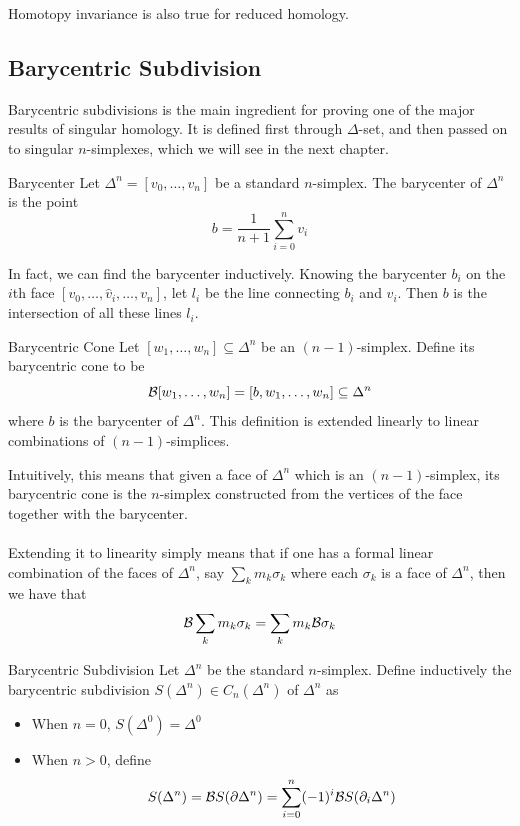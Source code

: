 \documentclass[a4paper]{article}
\begin{document}
Homotopy invariance is also true for reduced homology. 

\subsection{Barycentric Subdivision}
Barycentric subdivisions is the main ingredient for proving one of the major results of singular homology. It is defined first through $\Delta$-set, and then passed on to singular $n$-simplexes, which we will see in the next chapter. 

\begin{defn}{Barycenter}{} Let $\Delta^n=[v_0,\dots,v_n]$ be a standard $n$-simplex. The barycenter of $\Delta^n$ is the point $$b=\frac{1}{n+1}\sum_{i=0}^nv_i$$
\end{defn}

In fact, we can find the barycenter inductively. Knowing the barycenter $b_i$ on the $i$th face $[v_0,\dots,\hat{v}_i,\dots,v_n]$, let $l_i$ be the line connecting $b_i$ and $v_i$. Then $b$ is the intersection of all these lines $l_i$. 

\begin{defn}{Barycentric Cone}{} Let $[w_1,\dots,w_n]\subseteq\Delta^n$ be an $(n-1)$-simplex. Define its barycentric cone to be $$\mathcal{B}[w_1,\dots,w_n]=[b,w_1,\dots,w_n]\subseteq\Delta^n$$ where $b$ is the barycenter of $\Delta^n$. This definition is extended linearly to linear combinations of $(n-1)$-simplices. 
\end{defn}

Intuitively, this means that given a face of $\Delta^n$ which is an $(n-1)$-simplex, its barycentric cone is the $n$-simplex constructed from the vertices of the face together with the barycenter. \\~\\

Extending it to linearity simply means that if one has a formal linear combination of the faces of $\Delta^n$, say $\sum_{k}m_k\sigma_k$ where each $\sigma_k$ is a face of $\Delta^n$, then we have that $$\mathcal{B}\sum_km_k\sigma_k=\sum_km_k\mathcal{B}\sigma_k$$

\begin{defn}{Barycentric Subdivision}{} Let $\Delta^n$ be the standard $n$-simplex. Define inductively the barycentric subdivision $S(\Delta^n)\in C_n(\Delta^n)$ of $\Delta^n$ as
\begin{itemize}
\item When $n=0$, $S(\Delta^0)=\Delta^0$
\item When $n>0$, define $$S(\Delta^n)=\mathcal{B} S(\partial\Delta^n)=\sum_{i=0}^n(-1)^i\mathcal{B} S(\partial_i\Delta^n)$$
\end{itemize}
\end{defn}
\end{document}
